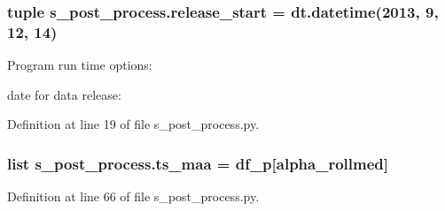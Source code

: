 \subsubsection[{release\+\_\+start}]{\setlength{\rightskip}{0pt plus 5cm}tuple s\+\_\+post\+\_\+process.\+release\+\_\+start = dt.\+datetime(2013, 9, 12, 14)}\label{namespaces__post__process_a5629689e4c1b3e73d3894e6d6741d57e}


Program run time options\+: 

date for data release\+: 

Definition at line 19 of file s\+\_\+post\+\_\+process.\+py.

\hypertarget{namespaces__post__process_a62c0d70001797ee6bd82752773e064b7}{}
\subsubsection[{ts\+\_\+maa}]{\setlength{\rightskip}{0pt plus 5cm}list s\+\_\+post\+\_\+process.\+ts\+\_\+maa = {\bf df\+\_\+p}\mbox{[}\textquotesingle{}alpha\+\_\+rollmed\textquotesingle{}\mbox{]}}\label{namespaces__post__process_a62c0d70001797ee6bd82752773e064b7}


Definition at line 66 of file s\+\_\+post\+\_\+process.\+py.

